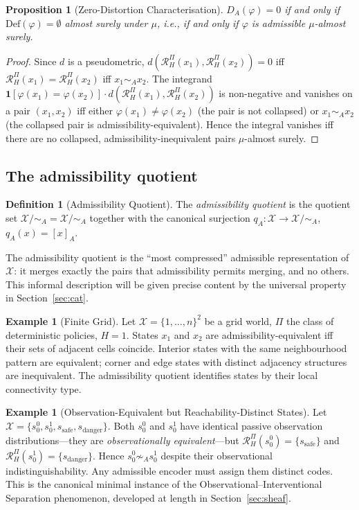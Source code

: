 \documentclass[11pt, a4paper]{article}
\theoremstyle{plain}
\newtheorem{proposition}[theorem]{Proposition}
\theoremstyle{definition}
\newtheorem{definition}[theorem]{Definition}
\newtheorem{example}[theorem]{Example}
\theoremstyle{remark}
\newcommand{\calX}{\mathcal{X}}
\newcommand{\simA}{\sim_{\!A}}
\newcommand{\RHP}{\mathcal{R}_{H}^{\Pi}}
\newcommand{\DA}{D_{A}(\varphi)}
\newcommand{\XmodA}{\calX/{\simA}}
\newcommand{\Def}{\mathrm{Def}}
\begin{document}
\begin{proposition}[Zero-Distortion Characterisation]
\label{prop:zero_dist}
$\DA = 0$ if and only if $\Def(\varphi) = \emptyset$ almost surely under
$\mu$, i.e., if and only if $\varphi$ is admissible $\mu$-almost surely.
\end{proposition}

\begin{proof}
Since $d$ is a pseudometric, $d(\RHP(x_1), \RHP(x_2)) = 0$ iff
$\RHP(x_1) = \RHP(x_2)$ iff $x_1 \simA x_2$. The integrand
$\mathbf{1}[\varphi(x_1) = \varphi(x_2)] \cdot d(\RHP(x_1), \RHP(x_2))$
is non-negative and vanishes on a pair $(x_1, x_2)$ iff either
$\varphi(x_1) \neq \varphi(x_2)$ (the pair is not collapsed) or
$x_1 \simA x_2$ (the collapsed pair is admissibility-equivalent). Hence
the integral vanishes iff there are no collapsed, admissibility-inequivalent
pairs $\mu$-almost surely.
\end{proof}

\subsection{The admissibility quotient}

\begin{definition}[Admissibility Quotient]
\label{def:quotient}
The \emph{admissibility quotient} is the quotient set
$\XmodA = \calX/{\simA}$ together with the canonical surjection
$q_A\colon \calX \to \XmodA$, $q_A(x) = [x]_A$.
\end{definition}

The admissibility quotient is the ``most compressed'' admissible representation
of $\calX$: it merges exactly the pairs that admissibility permits merging,
and no others. This informal description will be given precise content by the
universal property in Section~\ref{sec:cat}.

\begin{example}[Finite Grid]
\label{ex:grid}
Let $\calX = \{1, \ldots, n\}^2$ be a grid world, $\Pi$ the class of
deterministic policies, $H = 1$. States $x_1$ and $x_2$ are admissibility-equivalent
iff their sets of adjacent cells coincide. Interior states with the same
neighbourhood pattern are equivalent; corner and edge states with distinct
adjacency structures are inequivalent. The admissibility quotient identifies
states by their local connectivity type.
\end{example}

\begin{example}[Observation-Equivalent but Reachability-Distinct States]
\label{ex:oist}
Let $\calX = \{s_0^0, s_0^1, s_{\mathrm{safe}}, s_{\mathrm{danger}}\}$. Both
$s_0^0$ and $s_0^1$ have identical passive observation distributions---they are
\emph{observationally equivalent}---but $\RHP(s_0^0) = \{s_{\mathrm{safe}}\}$
and $\RHP(s_0^1) = \{s_{\mathrm{danger}}\}$. Hence $s_0^0 \not\simA s_0^1$
despite their observational indistinguishability. Any admissible encoder must
assign them distinct codes. This is the canonical minimal instance of the
Observational--Interventional Separation phenomenon, developed at length in
Section~\ref{sec:sheaf}.
\end{example}
\end{document}
